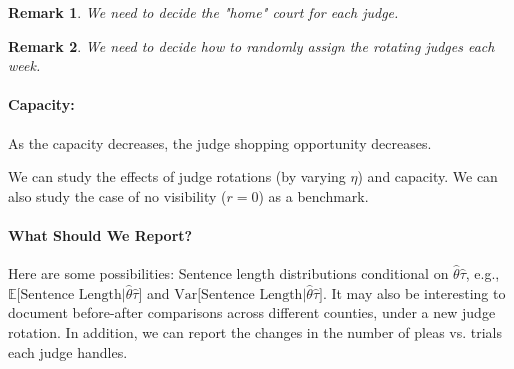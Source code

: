 \documentclass[11pt, oneside]{article}   	%
\theoremstyle{ModifiedStyle}
\newtheorem{remark}{Remark}
\begin{document}
\begin{remark}
	We need to decide the "home" court for each judge.
\end{remark}

\begin{remark}
	We need to decide how to randomly assign the rotating judges each week.
\end{remark}

\paragraph{Capacity:} As the capacity decreases, the judge shopping opportunity decreases.

We can study the effects of judge rotations (by varying $\eta$) and capacity. We can also study the case of no visibility ($r=0$) as a benchmark.


%
\vspace{-3mm}
\paragraph{What Should We Report?} Here are some possibilities: Sentence length distributions conditional
on $\hat{\theta}\hat{\tau}$, e.g., $\mathbb{E}\big[ \text{Sentence Length}\big| \hat{\theta}\hat{\tau} \big]$ and $\text{Var}\big[ \text{Sentence Length}\big| \hat{\theta}\hat{\tau} \big]$. It may also be interesting to document before-after comparisons across different counties, under a new judge rotation. In addition, we can report the changes in the number of pleas vs. trials each judge handles.
%





\clearpage
\appendix
\end{document}
